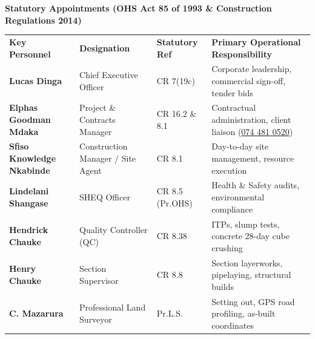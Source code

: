 \vspace{0.18cm}

{\large\bfseries\color{mhnavy} Statutory Appointments (OHS Act 85 of 1993 \& Construction Regulations 2014)}
\vspace{0.08cm}

\noindent
\renewcommand{\arraystretch}{1.18}
\begin{tabularx}{\textwidth}{@{}p{3.8cm} p{3.4cm} p{2.2cm} X@{}}
\rowcolor{mhnavy}
{\color{white}\bfseries\fontsize{8pt}{9.8pt}\selectfont Key Personnel} &
{\color{white}\bfseries\fontsize{8pt}{9.8pt}\selectfont Designation} &
{\color{white}\bfseries\fontsize{8pt}{9.8pt}\selectfont Statutory Ref} &
{\color{white}\bfseries\fontsize{8pt}{9.8pt}\selectfont Primary Operational Responsibility} \\
\rowcolor{mhbluelight}
\fontsize{7.6pt}{9.5pt}\selectfont\bfseries Lucas Dinga & \fontsize{7.6pt}{9.5pt}\selectfont Chief Executive Officer & \fontsize{7.6pt}{9.5pt}\selectfont CR 7(19c) & \fontsize{7.6pt}{9.5pt}\selectfont Corporate leadership, commercial sign-off, tender bids \\
\fontsize{7.6pt}{9.5pt}\selectfont\bfseries Elphas Goodman Mdaka & \fontsize{7.6pt}{9.5pt}\selectfont Project \& Contracts Manager & \fontsize{7.6pt}{9.5pt}\selectfont CR 16.2 \& 8.1 & \fontsize{7.6pt}{9.5pt}\selectfont Contractual administration, client liaison (\href{tel:0744810520}{074 481 0520}) \\
\rowcolor{mhbluelight}
\fontsize{7.6pt}{9.5pt}\selectfont\bfseries Sfiso Knowledge Nkabinde & \fontsize{7.6pt}{9.5pt}\selectfont Construction Manager / Site Agent & \fontsize{7.6pt}{9.5pt}\selectfont CR 8.1 & \fontsize{7.6pt}{9.5pt}\selectfont Day-to-day site management, resource execution \\
\fontsize{7.6pt}{9.5pt}\selectfont\bfseries Lindelani Shangase & \fontsize{7.6pt}{9.5pt}\selectfont SHEQ Officer & \fontsize{7.6pt}{9.5pt}\selectfont CR 8.5 (Pr.OHS) & \fontsize{7.6pt}{9.5pt}\selectfont Health \& Safety audits, environmental compliance \\
\rowcolor{mhbluelight}
\fontsize{7.6pt}{9.5pt}\selectfont\bfseries Hendrick Chauke & \fontsize{7.6pt}{9.5pt}\selectfont Quality Controller (QC) & \fontsize{7.6pt}{9.5pt}\selectfont CR 8.38 & \fontsize{7.6pt}{9.5pt}\selectfont ITPs, slump tests, concrete 28-day cube crushing \\
\fontsize{7.6pt}{9.5pt}\selectfont\bfseries Henry Chauke & \fontsize{7.6pt}{9.5pt}\selectfont Section Supervisor & \fontsize{7.6pt}{9.5pt}\selectfont CR 8.8 & \fontsize{7.6pt}{9.5pt}\selectfont Section layerworks, pipelaying, structural builds \\
\rowcolor{mhbluelight}
\fontsize{7.6pt}{9.5pt}\selectfont\bfseries C. Mazarura & \fontsize{7.6pt}{9.5pt}\selectfont Professional Land Surveyor & \fontsize{7.6pt}{9.5pt}\selectfont Pr.L.S. & \fontsize{7.6pt}{9.5pt}\selectfont Setting out, GPS road profiling, as-built coordinates \\
\end{tabularx}
\renewcommand{\arraystretch}{1}

